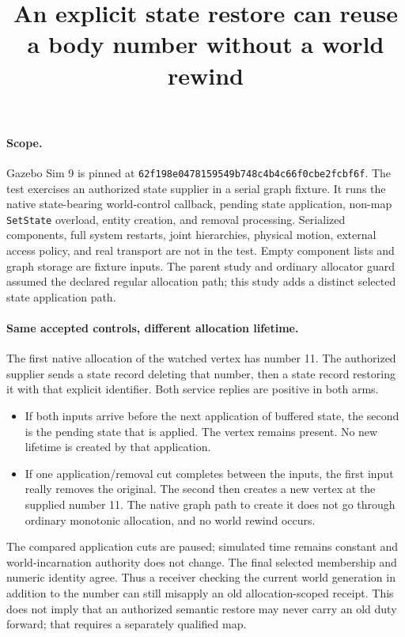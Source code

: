 \documentclass{article}
\begin{document}
\title{An explicit state restore can reuse a body number without a world rewind}
\maketitle

\paragraph{Scope.}
Gazebo Sim 9 is pinned at
\texttt{62f198e0478159549b748c4b4c66f0cbe2fcbf6f}.
The test exercises an authorized state supplier in a serial graph fixture.
It runs the native state-bearing world-control callback, pending state
application, non-map \texttt{SetState} overload, entity creation, and
removal processing. Serialized components, full system restarts, joint
hierarchies, physical motion, external access policy, and real transport
are not in the test. Empty component lists and graph storage are
fixture inputs. The parent study and ordinary allocator guard assumed
the declared regular allocation path; this study adds a distinct
selected state application path.

\paragraph{Same accepted controls, different allocation lifetime.}
The first native allocation of the watched vertex has number 11.
The authorized supplier sends a state record deleting that number,
then a state record restoring it with that explicit identifier.
Both service replies are positive in both arms.
\begin{itemize}
\item If both inputs arrive before the next application of buffered
state, the second is the pending state that is applied. The vertex
remains present. No new lifetime is created by that application.
\item If one application/removal cut completes between the inputs,
the first input really removes the original. The second then creates
a new vertex at the supplied number 11. The native graph path to create
it does not go through ordinary monotonic allocation, and no world
rewind occurs.
\end{itemize}
The compared application cuts are paused; simulated time remains
constant and world-incarnation authority does not change.
The final selected membership and numeric identity agree. Thus a
receiver checking the current world generation in addition to the
number can still misapply an old allocation-scoped receipt. This
does not imply that an authorized semantic restore may never carry
an old duty forward; that requires a separately qualified map.
\end{document}
